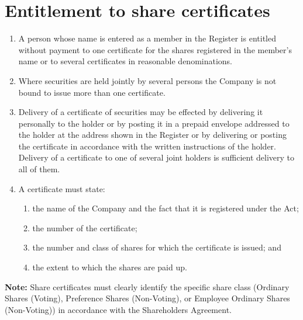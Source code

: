 \section{Entitlement to share certificates}

\begin{enumerate}[label=(\alph*)]
    \item A person whose name is entered as a member in the Register is entitled without payment to one certificate for the shares registered in the member's name or to several certificates in reasonable denominations.
    
    \item Where securities are held jointly by several persons the Company is not bound to issue more than one certificate.
    
    \item Delivery of a certificate of securities may be effected by delivering it personally to the holder or by posting it in a prepaid envelope addressed to the holder at the address shown in the Register or by delivering or posting the certificate in accordance with the written instructions of the holder. Delivery of a certificate to one of several joint holders is sufficient delivery to all of them.
    
    \item A certificate must state:
    \begin{enumerate}[label=(\roman*)]
        \item the name of the Company and the fact that it is registered under the Act;
        \item the number of the certificate;
        \item the number and class of shares for which the certificate is issued; and
        \item the extent to which the shares are paid up.
    \end{enumerate}
\end{enumerate}

\textbf{Note:} Share certificates must clearly identify the specific share class (Ordinary Shares (Voting), Preference Shares (Non-Voting), or Employee Ordinary Shares (Non-Voting)) in accordance with the Shareholders Agreement. 